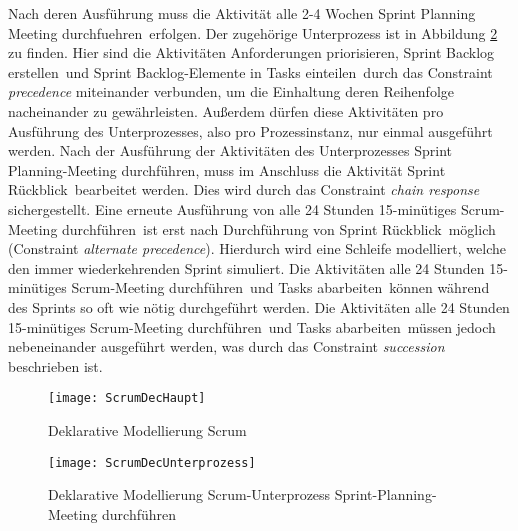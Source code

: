 Nach deren Ausführung muss die Aktivität \grqq alle 2-4 Wochen Sprint Planning Meeting durchfuehren\grqq \  erfolgen. Der zugehörige Unterprozess ist in Abbildung \ref{fig:ScrumDecUnterprozess} zu finden. Hier sind die Aktivitäten \grqq Anforderungen priorisieren\grqq, \grqq Sprint Backlog erstellen\grqq \ und \grqq Sprint Backlog-Elemente in Tasks einteilen\grqq \ durch das Constraint \textit{precedence} miteinander verbunden, um die Einhaltung deren Reihenfolge nacheinander zu gewährleisten. Außerdem dürfen diese Aktivitäten pro Ausführung des Unterprozesses, also pro Prozessinstanz, nur einmal ausgeführt werden.\newline
Nach der Ausführung der Aktivitäten des Unterprozesses Sprint Planning-Meeting durchführen, muss im Anschluss die Aktivität \grqq Sprint Rückblick\grqq \ bearbeitet werden. Dies wird durch das Constraint \textit{chain response} sichergestellt. Eine erneute Ausführung von \grqq alle 24 Stunden 15-minütiges Scrum-Meeting durchführen\grqq \ ist erst nach Durchführung von \grqq Sprint Rückblick\grqq \ möglich (Constraint \textit{alternate precedence}). Hierdurch wird eine Schleife modelliert, welche den immer wiederkehrenden Sprint simuliert.\newline
Die Aktivitäten \grqq alle 24 Stunden 15-minütiges Scrum-Meeting durchführen\grqq \ und \grqq Tasks abarbeiten\grqq \ können während des Sprints so oft wie nötig durchgeführt werden. Die Aktivitäten \grqq alle 24 Stunden 15-minütiges Scrum-Meeting durchführen\grqq \ und \grqq Tasks abarbeiten\grqq \ müssen jedoch nebeneinander ausgeführt werden, was durch das Constraint \textit{succession} beschrieben ist. \newline


\begin{figure}[htp]
\begin{center}
  \texttt{[image: ScrumDecHaupt]} %
  \caption{Deklarative Modellierung Scrum}
  \label{fig:ScrumDecHaupt}
\end{center}
\end{figure}



\begin{figure}[htp]
\begin{center}
  \texttt{[image: ScrumDecUnterprozess]} %
  \caption{Deklarative Modellierung Scrum-Unterprozess Sprint-Planning-Meeting durchführen}
  \label{fig:ScrumDecUnterprozess}
\end{center}
\end{figure}
\clearpage

